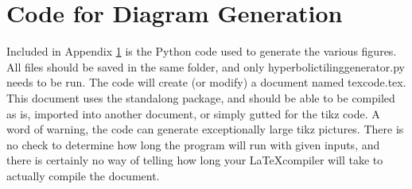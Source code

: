 \documentclass[class=book, crop=false,12 pt]{standalone}
\begin{document}
\chapter{Code for Diagram Generation}
\label{ch:app}
Included in Appendix \ref{ch:app} is the Python code used to generate the various figures. All files should be saved in the same folder, and only hyperbolictilinggenerator.py needs to be run. The code will create (or modify) a document named texcode.tex. This document uses the standalong package, and should be able to be compiled as is, imported into another document, or simply gutted for the tikz code. A word of warning, the code can generate exceptionally large tikz pictures. There is no check to determine how long the program will run with given inputs, and there is certainly no way of telling how long your \LaTeX compiler will take to actually compile the document.


\end{document}
